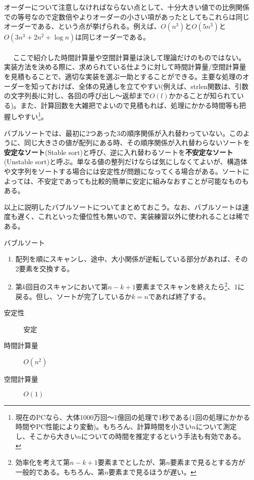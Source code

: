 オーダーについて注意しなければならない点として、十分大きい値での比例関係での等号なので定数倍やよりオーダーの小さい項があったとしてもこれらは同じオーダーである、という点が挙げられる。例えば、$O(n^3)$と$O(5n^3)$と$O(3n^3+2n^2+\log n)$は同じオーダーである。
\\ \\　
ここで紹介した時間計算量や空間計算量は決して理論だけのものではない。実装方法を決める際に、求められている仕ように対して時間計算量/空間計算量を見積もることで、適切な実装を選ぶ一助とすることができる。主要な処理のオーダーを知っておけば、全体の見通しを立てやすい(例えば、strlen関数は、引数の文字列長$l$に対し、各回の呼び出し〜返却まで$O(l)$かかることが知られている)。また、計算回数を大雑把でよいので見積もれば、処理にかかる時間等も把握しやすい\footnote{現在のPCなら、大体1000万回〜1億回の処理で1秒である(1回の処理にかかる時間やPC性能により変動)。もちろん、計算時間を小さい$n$について測定し、そこから大きい$n$についての時間を推定するという手法も有効である。}。

バブルソートでは、最初に2つあった3の順序関係が入れ替わっていない。このように、同じ大きさの値が配列にある時、その順序関係が入れ替わらないソートを\textbf{安定なソート}(Stable sort)と呼び、逆に入れ替わるソートを\textbf{不安定なソート}(Unstable sort)と呼ぶ。単なる値の整列だけならば気にしなくてよいが、構造体や文字列をソートする場合には安定性が問題になってくる場合がある。ソートによっては、不安定であっても比較的簡単に安定に組みなおすことが可能なものもある。

以上に説明したバブルソートについてまとめておこう。なお、バブルソートは速度も遅く、これといった優位性も無いので、実装練習以外に使われることは稀である。
\begin{itembox}[l]{バブルソート}
\begin{enumerate}
\item 配列を順にスキャンし、途中、大小関係が逆転している部分があれば、その2要素を交換する。
\item 第$k$回目のスキャンにおいて第$n-k+1$要素までスキャンを終えたら\footnote{効率化を考えて第$n-k+1$要素までとしたが、第$n$要素まで見るとする方が一般的である。もちろん、第$n$要素まで見るほうが遅い。}、1に戻る。但し、ソートが完了しているか$k=n$であれば終了する。
\end{enumerate}
\begin{multicols}{3}
\begin{description}
\item[安定性] 安定
\item[時間計算量] $O(n^2)$
\item[空間計算量] $O(1)$
\end{description}
\end{multicols}
\end{itembox}

